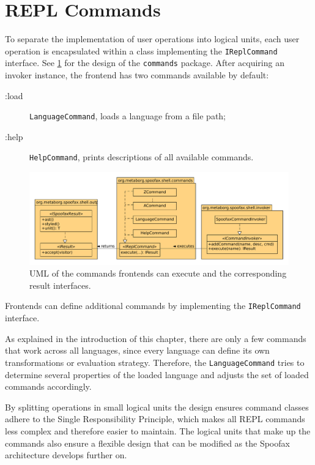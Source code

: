 \section{REPL Commands}
\label{sec:commands}

To separate the implementation of user operations into logical units, each user
operation is encapsulated within a class implementing the
\texttt{IReplCommand} interface. See \cref{fig:uml-commands} for the design
of the \texttt{commands} package. After acquiring an invoker instance, the
frontend has two commands available by default:

\begin{description}
  \item [:load] \texttt{LanguageCommand}, loads a language from a file path;
  \item [:help] \texttt{HelpCommand}, prints descriptions of all available commands.
\end{description}

\begin{figure}[h]
  \centering
  \includegraphics[width=\textwidth]{uml-commands}
  \caption{UML of the commands frontends can execute and the
           corresponding result interfaces.}
  \label{fig:uml-commands}
\end{figure}

Frontends can define additional commands by implementing the
\texttt{IReplCommand} interface.

As explained in the introduction of this chapter, there are only a few
commands that work across all languages, since every language can define its
own transformations or evaluation strategy. Therefore, the
\texttt{LanguageCommand} tries to determine several properties of the loaded
language and adjusts the set of loaded commands accordingly.

By splitting operations in small logical units the design ensures command
classes adhere to the Single Responsibility Principle, which makes all REPL
commands less complex and therefore easier to maintain. The logical units that
make up the commands also ensure a flexible design that can be modified
as the Spoofax architecture develops further on.

